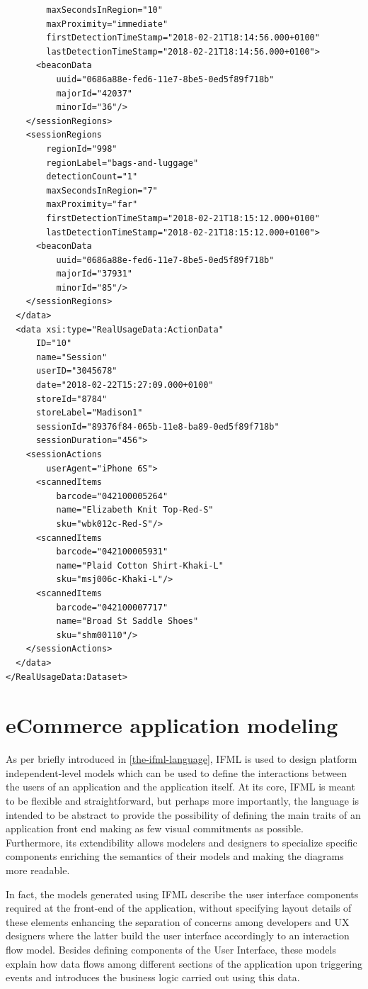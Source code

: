 \begin{lstlisting}
        maxSecondsInRegion="10"
        maxProximity="immediate"
        firstDetectionTimeStamp="2018-02-21T18:14:56.000+0100"
        lastDetectionTimeStamp="2018-02-21T18:14:56.000+0100">
      <beaconData
          uuid="0686a88e-fed6-11e7-8be5-0ed5f89f718b"
          majorId="42037"
          minorId="36"/>
    </sessionRegions>
    <sessionRegions
        regionId="998"
        regionLabel="bags-and-luggage"
        detectionCount="1"
        maxSecondsInRegion="7"
        maxProximity="far"
        firstDetectionTimeStamp="2018-02-21T18:15:12.000+0100"
        lastDetectionTimeStamp="2018-02-21T18:15:12.000+0100">
      <beaconData
          uuid="0686a88e-fed6-11e7-8be5-0ed5f89f718b"
          majorId="37931"
          minorId="85"/>
    </sessionRegions>
  </data>
  <data xsi:type="RealUsageData:ActionData"
      ID="10"
      name="Session"
      userID="3045678"
      date="2018-02-22T15:27:09.000+0100"
      storeId="8784"
      storeLabel="Madison1"
      sessionId="89376f84-065b-11e8-ba89-0ed5f89f718b"
      sessionDuration="456">
    <sessionActions
        userAgent="iPhone 6S">
      <scannedItems
          barcode="042100005264"
          name="Elizabeth Knit Top-Red-S"
          sku="wbk012c-Red-S"/>
      <scannedItems
          barcode="042100005931"
          name="Plaid Cotton Shirt-Khaki-L"
          sku="msj006c-Khaki-L"/>
      <scannedItems
          barcode="042100007717"
          name="Broad St Saddle Shoes"
          sku="shm00110"/>
    </sessionActions>
  </data>
</RealUsageData:Dataset>
\end{lstlisting}

\section{eCommerce application modeling}

As per briefly introduced in \ref{the-ifml-language}, IFML is used to design platform independent-level models which can be used to define the interactions between the users of an application and the application itself. 
At its core, IFML is meant to be flexible and straightforward, but perhaps more importantly, the language is intended to be abstract to provide the possibility of defining the main traits of an application front end making as few visual commitments as possible. Furthermore, its extendibility  allows modelers and designers to specialize specific components enriching the semantics of their models and making the diagrams more readable.

In fact, the models generated using IFML describe the user interface components required at the front-end of the application, without specifying layout details of these elements enhancing the separation of concerns among developers and UX designers where the latter build the user interface accordingly to an interaction flow model. Besides defining components of the User Interface, these models explain how data flows among different sections of the application upon triggering events and introduces the business logic carried out using this data.

